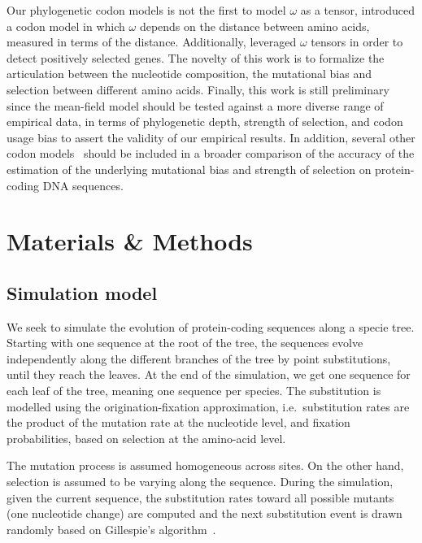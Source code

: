 \documentclass{article}
\begin{document}
Our phylogenetic codon models is not the first to model $\omega$ as a tensor, \citet{Yang1998a} introduced a codon model in which $\omega$ depends on the distance between amino acids, measured in terms of the \citet{Grantham1974} distance.
Additionally, \citet{Tang2006} leveraged  $\omega$ tensors in order to detect positively selected genes.
The novelty of this work is to formalize the articulation between the nucleotide composition, the mutational bias and selection between different amino acids.
Finally, this work is still preliminary since the mean-field model should be tested against a more diverse range of empirical data, in terms of phylogenetic depth, strength of selection, and {codon usage bias} to assert the validity of our empirical results.
In addition, several other codon models~\citep{Rodrigue2008a,KosakovskyPond2020} should be included in a broader comparison of the accuracy of the estimation of the underlying mutational bias and strength of selection on protein-coding {DNA} sequences.

\section{Materials \& Methods}

\subsection{Simulation model}
\label{sec:mut-bias-simu}
We seek to simulate the evolution of protein-coding sequences along a specie tree.
Starting with one sequence at the root of the tree, the sequences evolve independently along the different branches of the tree by point {substitutions}, until they reach the leaves.
At the end of the simulation, we get one sequence for each leaf of the tree, meaning one sequence per species.
The {substitution} is modelled using the origination-fixation approximation, i.e.~substitution rates are the product of the mutation rate at the nucleotide level, and fixation probabilities, based on selection at the amino-acid level.

The mutation process is assumed homogeneous across sites.
On the other hand, selection is assumed to be varying along the sequence.
During the simulation, given the current sequence, the {substitution} rates toward all possible mutants (one nucleotide change) are computed and the next {substitution} event is drawn randomly based on Gillespie's algorithm~\citep{Gillespie1977}.
\end{document}
